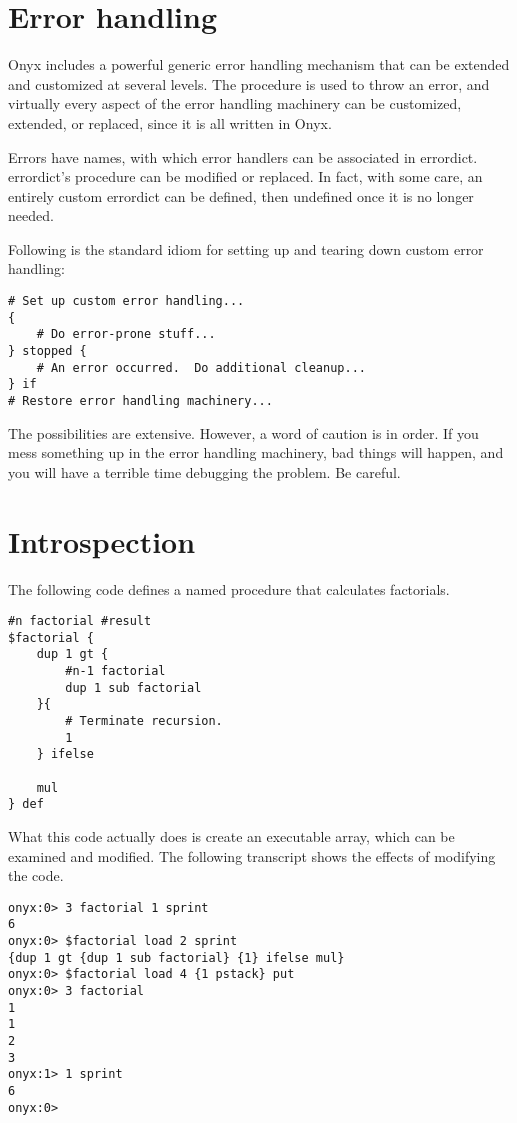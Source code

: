 \section{Error handling}
Onyx includes a powerful generic error handling mechanism that can be extended
and customized at several levels.  The
 procedure is used to throw an
error, and virtually every aspect of the error handling machinery can be
customized, extended, or replaced, since it is all written in Onyx.

Errors have names, with which error handlers can be associated in errordict.
errordict's  procedure
can be modified or replaced.  In fact, with some care, an entirely custom
errordict can be defined, then undefined once it is no longer needed.

Following is the standard idiom for setting up and tearing down custom error
handling:

\begin{verbatim}
# Set up custom error handling...
{
    # Do error-prone stuff...
} stopped {
    # An error occurred.  Do additional cleanup...
} if
# Restore error handling machinery...
\end{verbatim}

The possibilities are extensive.  However, a word of caution is in order.  If
you mess something up in the error handling machinery, bad things will happen,
and you will have a terrible time debugging the problem.  Be careful.

\section{Introspection}
\label{onyxtut:introspection}

The following code defines a named procedure that calculates factorials.

\begin{verbatim}
#n factorial #result
$factorial {
    dup 1 gt {
        #n-1 factorial
        dup 1 sub factorial
    }{
        # Terminate recursion.
        1
    } ifelse

    mul
} def
\end{verbatim}

What this code actually does is create an executable array, which can be
examined and modified.  The following transcript shows the effects of modifying
the code.

\begin{verbatim}
onyx:0> 3 factorial 1 sprint
6
onyx:0> $factorial load 2 sprint
{dup 1 gt {dup 1 sub factorial} {1} ifelse mul}
onyx:0> $factorial load 4 {1 pstack} put
onyx:0> 3 factorial
1
1
2
3
onyx:1> 1 sprint
6
onyx:0>
\end{verbatim}

